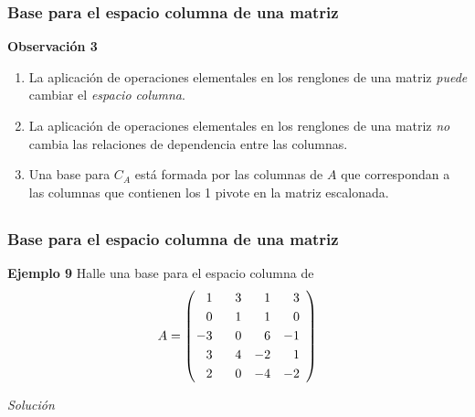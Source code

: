 \begin{frame}\frametitle{Base para el espacio columna de una matriz}

\begin{alertblock}{\textbf{Observación 3}}
	\begin{enumerate}\justifying
		\item[\labelname{$a$}] La aplicación de operaciones elementales en los renglones de una matriz
		\textit{puede} cambiar el \textit{espacio columna}.	
		\item[\labelname{$b$}] La aplicación de operaciones elementales en los renglones de una matriz
		\textit{no} cambia las relaciones de dependencia entre las columnas.
		\item[\labelname{$b$}] Una base para $C_A$ está formada por las columnas de $A$ que correspondan 
		a las columnas que contienen los 1 pivote en la matriz escalonada.
	\end{enumerate}
\end{alertblock}


\end{frame}


\subsection{}

\begin{frame}\frametitle{Base para el espacio columna de una matriz}
		
	\begin{ej}{\textbf{Ejemplo  9}}
		Halle una base para el espacio columna de 
		\[
		A = 
		\left( 
		\begin{array}{@{\hspace{0.1\tabcolsep}}rrrr}	
		1 & \phantom{-}3 & 1 &  3 \\[1mm] 
		0 & 1 & 1 &  0 \\[1mm] 
		-3 & 0 & 6 & -1 \\[1mm] 
		3 & 4 & -2 & 1 \\[1mm] 
		2 & 0 & -4 & -2
		\end{array} 
		\right)
		\]
	\end{ej}
	\textit{Solución}
	
\end{frame}


